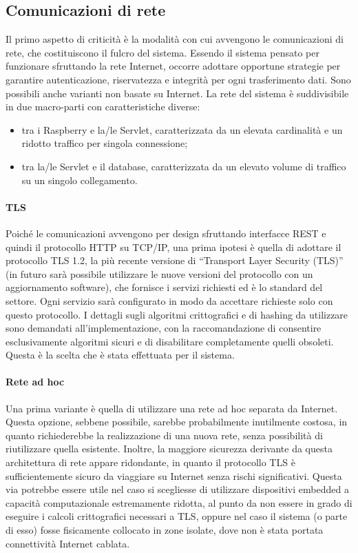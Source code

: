 \subsection{Comunicazioni di rete}
Il primo aspetto di criticità è la modalità con cui avvengono le comunicazioni di rete, che costituiscono il fulcro del sistema.
Essendo il sistema pensato per funzionare sfruttando la rete Internet, occorre adottare opportune strategie per garantire autenticazione, riservatezza e integrità per ogni trasferimento dati.
Sono possibili anche varianti non basate su Internet.
La rete del sistema è suddivisibile in due macro-parti con caratteristiche diverse:
\begin{itemize}
 \item tra i Raspberry e la/le Servlet, caratterizzata da un elevata cardinalità e un ridotto traffico per singola connessione;
 \item tra la/le Servlet e il database, caratterizzata da un elevato volume di traffico su un singolo collegamento.
\end{itemize}
\paragraph{TLS}
Poiché le comunicazioni avvengono per design sfruttando interfacce REST e quindi il protocollo HTTP su TCP/IP, una prima ipotesi è quella di adottare il protocollo TLS 1.2, la più recente versione di ``Transport Layer Security (TLS)'' (in futuro sarà possibile utilizzare le nuove versioni del protocollo con un aggiornamento software), che fornisce i servizi richiesti ed è lo standard del settore.
Ogni servizio sarà configurato in modo da accettare richieste solo con questo protocollo.
I dettagli sugli algoritmi crittografici e di hashing da utilizzare sono demandati all'implementazione, con la raccomandazione di consentire esclusivamente algoritmi sicuri e di disabilitare completamente quelli obsoleti.
Questa è la scelta che è stata effettuata per il sistema.
\paragraph{Rete ad hoc}
Una prima variante è quella di utilizzare una rete ad hoc separata da Internet.
Questa opzione, sebbene possibile, sarebbe probabilmente inutilmente costosa, in quanto richiederebbe la realizzazione di una nuova rete, senza possibilità di riutilizzare quella esistente.
Inoltre, la maggiore sicurezza derivante da questa architettura di rete appare ridondante, in quanto il protocollo TLS è sufficientemente sicuro da viaggiare su Internet senza rischi significativi.
Questa via potrebbe essere utile nel caso si scegliesse di utilizzare dispositivi embedded a capacità computazionale estremamente ridotta, al punto da non essere in grado di eseguire i calcoli crittografici necessari a TLS, oppure nel caso il sistema (o parte di esso) fosse fisicamente collocato in zone isolate, dove non è stata portata connettività Internet cablata.
